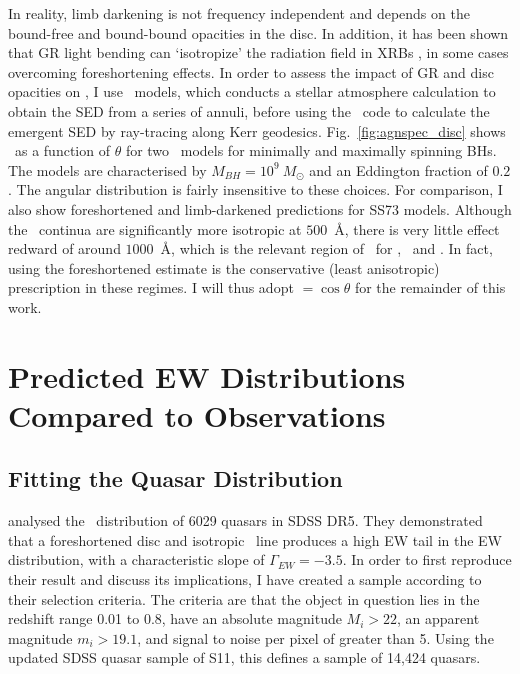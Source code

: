 \noindent
In reality, limb darkening is not frequency independent and 
depends on the bound-free and bound-bound opacities in the disc.
In addition, it has been shown that GR light bending can `isotropize' the radiation
field in XRBs \citep{zhang1997,munozdarias2013}, in some cases overcoming
foreshortening effects. In order to assess the impact of GR and disc opacities
on \ept, I use \agn\ models, which conducts a stellar atmosphere calculation
to obtain the SED from a series of annuli, before using the \kerrtrans\ code 
to calculate the emergent SED by ray-tracing along Kerr geodesics.
Fig.~\ref{fig:agnspec_disc} shows \ept\ as a function of 
$\theta$ for two \agn\ models for minimally and maximally spinning BHs. 
The models are characterised by $M_{BH}=10^9~M_\odot$ and an Eddington fraction of $0.2$.
The angular distribution is fairly insensitive to these choices.
For comparison, I also show foreshortened and limb-darkened predictions for SS73 models.
Although the \agn\ continua are significantly more isotropic at $500$~\AA,
there is very little effect redward of around $1000$~\AA, which is the relevant
region of \ept\ for \oiiifull, \civline\ and \mgline . 
In fact, using the foreshortened estimate is the conservative (least anisotropic) prescription 
in these regimes. I will thus adopt \ept$=\cos \theta$ for the remainder of this work.










\section{Predicted EW Distributions Compared to Observations}
\label{sec:mc_angular}

\subsection{Fitting the Quasar Distribution}
\label{sec:fitting}

\citet[][hereafter R11]{risaliti2011} analysed the \ewo\ 
distribution of 6029 quasars in SDSS DR5. They demonstrated
that a foreshortened disc and isotropic \oiiifull\ line produces
a high EW tail in the EW distribution, with a characteristic 
slope of $\Gamma_{EW}=-3.5$. In order to first reproduce their
result and discuss its implications, I have 
created a sample according to their selection
criteria. The criteria are that the object in question lies in the redshift
range 0.01 to 0.8, have an absolute magnitude $M_i>22$, an 
apparent magnitude $m_i>19.1$, and signal to noise per pixel of greater
than 5. Using the updated SDSS quasar sample of S11, this defines
a sample of 14,424 quasars.

